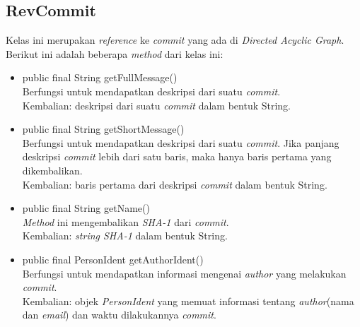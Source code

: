 \subsection{RevCommit}
\label{subsec:revcommit}
Kelas ini merupakan \textit{reference} ke \textit{commit} yang ada di \textit{Directed Acyclic Graph}. Berikut ini adalah  beberapa \textit{method} dari kelas ini:
\begin{itemize}
\item public final String getFullMessage()\\
Berfungsi untuk mendapatkan deskripsi dari suatu \textit{commit}.\\
Kembalian: deskripsi dari suatu \textit{commit} dalam bentuk String.

\item public final String getShortMessage()\\
Berfungsi untuk mendapatkan deskripsi dari suatu \textit{commit}. Jika panjang deskripsi \textit{commit} lebih dari satu baris, maka hanya baris pertama yang dikembalikan.\\
Kembalian: baris pertama dari deskripsi \textit{commit} dalam bentuk String.

\item public final String getName()\\
\textit{Method} ini mengembalikan \textit{SHA-1} dari \textit{commit}.\\
Kembalian: \textit{string SHA-1} dalam bentuk String. 

\item public final PersonIdent getAuthorIdent()\\
Berfungsi untuk mendapatkan informasi mengenai \textit{author} yang melakukan \textit{commit}.\\
Kembalian: objek \textit{PersonIdent} yang memuat informasi tentang \textit{author}(nama dan \textit{email}) dan waktu dilakukannya \textit{commit}.
\end{itemize}

